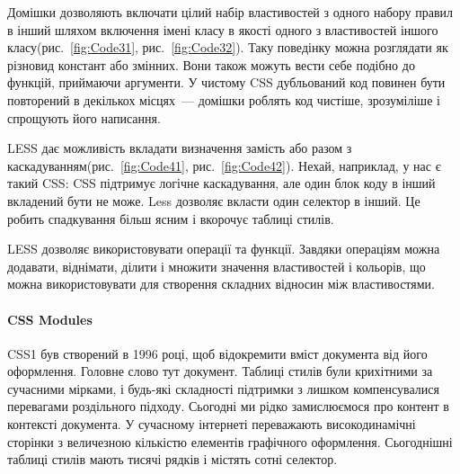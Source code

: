 
Домішки дозволяють включати цілий набір властивостей з одного набору правил в інший шляхом включення імені класу в якості одного з властивостей іншого класу(рис.~\ref{fig:Code31}, рис.~\ref{fig:Code32}). Таку поведінку можна розглядати як різновид констант або змінних. Вони також можуть вести себе подібно до функцій, приймаючи аргументи. У чистому CSS дубльований код повинен бути повторений в декількох місцях~--- домішки роблять код чистіше, зрозуміліше і спрощують його написання.



LESS дає можливість вкладати визначення замість або разом з каскадуванням(рис.~\ref{fig:Code41}, рис.~\ref{fig:Code42}). Нехай, наприклад, у нас є такий CSS: CSS підтримує логічне каскадування, але один блок коду в інший вкладений бути не може. Less дозволяє вкласти один селектор в інший. Це робить спадкування більш ясним і вкорочує таблиці стилів.



LESS дозволяє використовувати операції та функції. Завдяки операціям можна додавати, віднімати, ділити і множити значення властивостей і кольорів, що можна використовувати для створення складних відносин між властивостями.

\paragraph{CSS Modules}

CSS1 був створений в 1996 році, щоб відокремити вміст документа від його оформлення. Головне слово тут документ. Таблиці стилів були крихітними за сучасними мірками, і будь-які складності підтримки з лишком компенсувалися перевагами роздільного підходу. Сьогодні ми рідко замислюємося про контент в контексті документа. У сучасному інтернеті переважають високодинамічні сторінки з величезною кількістю елементів графічного оформлення. Сьогоднішні таблиці стилів мають тисячі рядків і містять сотні селектор.

